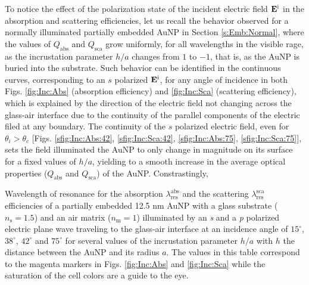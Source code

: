 To notice the effect of the  polarization state of the incident electric field $\vb{E}^\text{i}$ in the absorption and scattering efficiencies, let us recall the behavior observed for a normally illuminated partially embedded AuNP in Section \ref{s:Emb:Normal}, where the values of $Q_\text{abs}$ and $Q_\text{sca}$ grow uniformly, for all wavelengths in the visible rage, as the incrustation parameter $h/a$ changes from $1$ to $-1$, that is, as the AuNP is buried into the substrate. Such behavior can be identified in the continuous curves, corresponding to an $s$ polarized $\vb{E}^\text{i}$, for any angle of incidence in both Figs. \ref{fig:Inc:Abs} (absorption efficiency) and \ref{fig:Inc:Sca} (scattering efficiency), which is explained by the direction of the electric field not changing across the glass-air interface due to the continuity of the parallel components of the electric filed at any boundary. The continuity of the $s$ polarized electric field, even for $\theta_i>\theta_c$ [Figs. \ref{sfig:Inc:Abs:42},  \ref{sfig:Inc:Sca:42},  \ref{sfig:Inc:Abs:75},  \ref{sfig:Inc:Sca:75}], sets the field illuminated the AuNP to only change in magnitude on its surface for a fixed values of $h/a$, yielding to a smooth increase in the average optical properties ($Q_\text{abs}$ and $Q_\text{sca}$) of the AuNP. Constrastingly, 









\begin{table}[h!]\footnotesize\centering
    \caption{Wavelength of resonance for the absorption $\lambda_\text{res}^\text{abs}$ and the scattering $\lambda_\text{res}^\text{sca}$ efficiencies of a partially embedded 12.5 nm AuNP with a glass substrate ($n_\text{s} = 1.5$) and an air matrix ($n_\text{m} = 1$)    illuminated by an \textit{s} and a \textit{p} polarized electric plane wave traveling to the glass-air interface at an incidence angle of $15^\circ$,  $38^\circ$,  $42^\circ$ and  $75^\circ$ for several values of the incrustation parameter $h/a$ with $h$ the distance between the AuNP and its radius $a$. The values in this table correspond to the magenta markers in Figs. \ref{fig:Inc:Abs} and \ref{fig:Inc:Sca} while the saturation of the cell colors are a guide to the eye.}
    \label{tab:Resonances}
    
\end{table}











